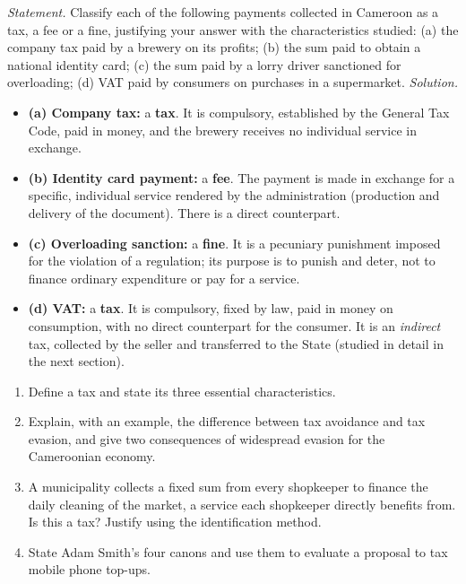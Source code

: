 \documentclass[11pt]{article}
\begin{document}
\begin{exoresolu}
\emph{Statement.} Classify each of the following payments collected in Cameroon as a tax, a fee or a fine, justifying your answer with the characteristics studied: (a) the company tax paid by a brewery on its profits; (b) the sum paid to obtain a national identity card; (c) the sum paid by a lorry driver sanctioned for overloading; (d) VAT paid by consumers on purchases in a supermarket.
\tcblower
\emph{Solution.}
\begin{itemize}
\item \textbf{(a) Company tax:} a \textbf{tax}. It is compulsory, established by the General Tax Code, paid in money, and the brewery receives no individual service in exchange.
\item \textbf{(b) Identity card payment:} a \textbf{fee}. The payment is made in exchange for a specific, individual service rendered by the administration (production and delivery of the document). There is a direct counterpart.
\item \textbf{(c) Overloading sanction:} a \textbf{fine}. It is a pecuniary punishment imposed for the violation of a regulation; its purpose is to punish and deter, not to finance ordinary expenditure or pay for a service.
\item \textbf{(d) VAT:} a \textbf{tax}. It is compulsory, fixed by law, paid in money on consumption, with no direct counterpart for the consumer. It is an \emph{indirect} tax, collected by the seller and transferred to the State (studied in detail in the next section).
\end{itemize}
\end{exoresolu}

\begin{exercice}
\begin{enumerate}
\item Define a tax and state its three essential characteristics.
\item Explain, with an example, the difference between tax avoidance and tax evasion, and give two consequences of widespread evasion for the Cameroonian economy.
\item A municipality collects a fixed sum from every shopkeeper to finance the daily cleaning of the market, a service each shopkeeper directly benefits from. Is this a tax? Justify using the identification method.
\item State Adam Smith's four canons and use them to evaluate a proposal to tax mobile phone top-ups.
\end{enumerate}
\end{exercice}
\end{document}
